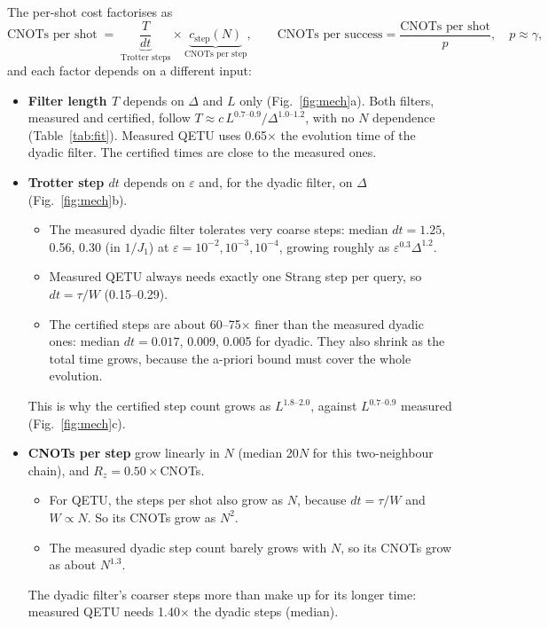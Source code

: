 \documentclass[10pt]{article}
\begin{document}
The per-shot cost factorises as
\begin{equation}
\text{CNOTs per shot}\;=\;\underbrace{\frac{T}{dt}}_{\text{Trotter steps}}\times\underbrace{c_\text{step}(N)}_{\text{CNOTs per step}},
\qquad
\text{CNOTs per success}=\frac{\text{CNOTs per shot}}{p},\quad p\approx\gamma,
\end{equation}
and each factor depends on a different input:
\begin{itemize}
\item \textbf{Filter length $T$} depends on $\Delta$ and $L$ only (Fig.~\ref{fig:mech}a). Both filters, measured
and certified, follow $T\approx c\,L^{0.7\text{--}0.9}/\Delta^{1.0\text{--}1.2}$, with no $N$ dependence
(Table~\ref{tab:fit}). Measured QETU uses 0.65$\times$ the evolution time of the dyadic filter. The certified
times are close to the measured ones.
\item \textbf{Trotter step $dt$} depends on $\varepsilon$ and, for the dyadic filter, on $\Delta$
(Fig.~\ref{fig:mech}b).
  \begin{itemize}
  \item The measured dyadic filter tolerates very coarse steps: median $dt=1.25$, 0.56, 0.30 (in $1/J_1$) at
  $\varepsilon=10^{-2},10^{-3},10^{-4}$, growing roughly as $\varepsilon^{0.3}\Delta^{1.2}$.
  \item Measured QETU always needs exactly one Strang step per query, so $dt=\tau/W$ (0.15--0.29).
  \item The certified steps are about 60--75$\times$ finer than the measured dyadic ones: median $dt=0.017$, 0.009, 0.005 for dyadic. They also
  shrink as the total time grows, because the a-priori bound must cover the whole evolution.
  \end{itemize}
  This is why the certified step count grows as $L^{1.8\text{--}2.0}$, against $L^{0.7\text{--}0.9}$ measured
  (Fig.~\ref{fig:mech}c).
\item \textbf{CNOTs per step} grow linearly in $N$ (median 20$N$ for this two-neighbour chain), and
$R_z=0.50\times$CNOTs.
  \begin{itemize}
  \item For QETU, the steps per shot also grow as $N$, because $dt=\tau/W$ and $W\propto N$. So its CNOTs grow as
  $N^{2}$.
  \item The measured dyadic step count barely grows with $N$, so its CNOTs grow as about $N^{1.3}$.
  \end{itemize}
  The dyadic filter's coarser steps more than make up for its longer time: measured QETU needs 1.40$\times$
  the dyadic steps (median).
\end{itemize}
\end{document}
